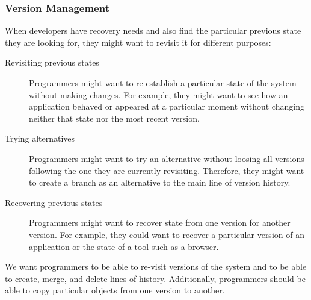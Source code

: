 \subsubsection{Version Management}

When developers have recovery needs and also find the particular previous state they are looking for, they might want to revisit it for different purposes:

\begin{description}
    \item[Revisiting previous states] Programmers might want to re-establish a particular state of the system without making changes. For example, they might want to see how an application behaved or appeared at a particular moment without changing neither that state nor the most recent version.
    \item[Trying alternatives] Programmers might want to try an alternative without loosing all versions following the one they are currently revisiting. Therefore, they might want to create a branch as an alternative to the main line of version history.
    \item[Recovering previous states] Programmers might want to recover state from one version for another version. For example, they could want to recover a particular version of an application or the state of a tool such as a browser. 
\end{description}

We want programmers to be able to re-visit versions of the system and to be able to create, merge, and delete lines of history.
Additionally, programmers should be able to copy particular objects from one version to another.
